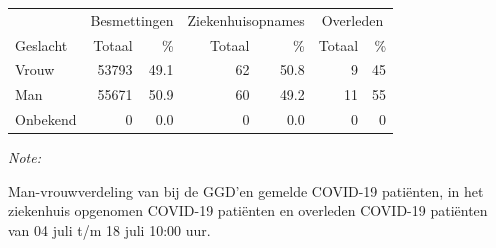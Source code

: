 \documentclass[
  english,
  man,floatsintext]{apa6}
\begin{document}
\begin{table}
\centering\begingroup\fontsize{11}{13}\selectfont

\begin{threeparttable}
\begin{tabular}{lrrrrrr}
\toprule
\multicolumn{1}{c}{ } & \multicolumn{2}{c}{Besmettingen} & \multicolumn{2}{c}{Ziekenhuisopnames} & \multicolumn{2}{c}{Overleden} \\
\cmidrule(l{3pt}r{3pt}){2-3} \cmidrule(l{3pt}r{3pt}){4-5} \cmidrule(l{3pt}r{3pt}){6-7}
Geslacht & Totaal & \% & Totaal & \% & Totaal & \%\\
\midrule
Vrouw & 53793 & 49.1 & 62 & 50.8 & 9 & 45\\
Man & 55671 & 50.9 & 60 & 49.2 & 11 & 55\\
Onbekend & 0 & 0.0 & 0 & 0.0 & 0 & 0\\
\bottomrule
\end{tabular}
\begin{tablenotes}
\item \textit{Note: } 
\item Man-vrouwverdeling van bij de GGD’en gemelde COVID-19 patiënten, in het ziekenhuis opgenomen COVID-19 patiënten en overleden COVID-19 patiënten van 04 juli t/m 18 juli 10:00 uur.
\end{tablenotes}
\end{threeparttable}
\endgroup{}
\end{table}
\newpage
\end{document}
